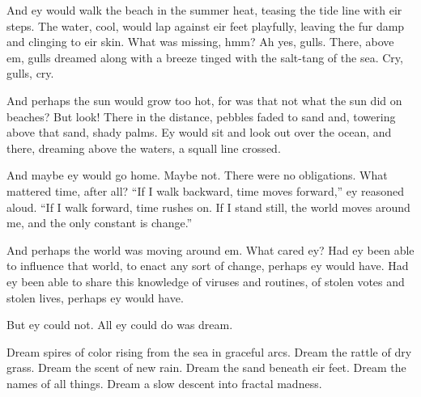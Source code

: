 And ey would walk the beach in the summer heat, teasing the tide line with eir steps. The water, cool, would lap against eir feet playfully, leaving the fur damp and clinging to eir skin. What was missing, hmm? Ah yes, gulls. There, above em, gulls dreamed along with a breeze tinged with the salt-tang of the sea. Cry, gulls, cry.

And perhaps the sun would grow too hot, for was that not what the sun did on beaches? But look! There in the distance, pebbles faded to sand and, towering above that sand, shady palms. Ey would sit and look out over the ocean, and there, dreaming above the waters, a squall line crossed.

And maybe ey would go home. Maybe not. There were no obligations. What mattered time, after all? ``If I walk backward, time moves forward,'' ey reasoned aloud. ``If I walk forward, time rushes on. If I stand still, the world moves around me, and the only constant is change.''

And perhaps the world was moving around em. What cared ey? Had ey been able to influence that world, to enact any sort of change, perhaps ey would have. Had ey been able to share this knowledge of viruses and routines, of stolen votes and stolen lives, perhaps ey would have.

But ey could not. All ey could do was dream.

Dream spires of color rising from the sea in graceful arcs. Dream the rattle of dry grass. Dream the scent of new rain. Dream the sand beneath eir feet. Dream the names of all things. Dream a slow descent into fractal madness.

